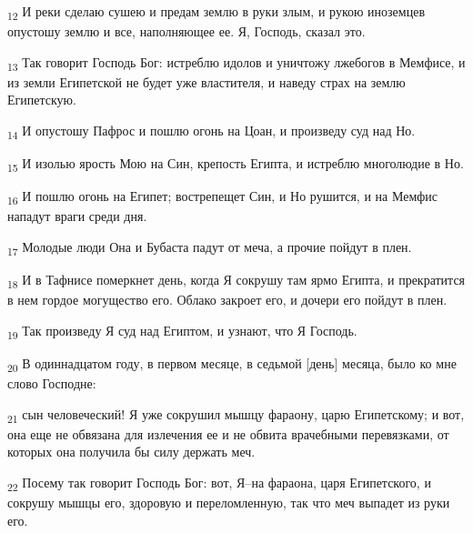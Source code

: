\begin{tcolorbox}
\textsubscript{12} И реки сделаю сушею и предам землю в руки злым, и рукою иноземцев опустошу землю и все, наполняющее ее. Я, Господь, сказал это.
\end{tcolorbox}
\begin{tcolorbox}
\textsubscript{13} Так говорит Господь Бог: истреблю идолов и уничтожу лжебогов в Мемфисе, и из земли Египетской не будет уже властителя, и наведу страх на землю Египетскую.
\end{tcolorbox}
\begin{tcolorbox}
\textsubscript{14} И опустошу Пафрос и пошлю огонь на Цоан, и произведу суд над Но.
\end{tcolorbox}
\begin{tcolorbox}
\textsubscript{15} И изолью ярость Мою на Син, крепость Египта, и истреблю многолюдие в Но.
\end{tcolorbox}
\begin{tcolorbox}
\textsubscript{16} И пошлю огонь на Египет; вострепещет Син, и Но рушится, и на Мемфис нападут враги среди дня.
\end{tcolorbox}
\begin{tcolorbox}
\textsubscript{17} Молодые люди Она и Бубаста падут от меча, а прочие пойдут в плен.
\end{tcolorbox}
\begin{tcolorbox}
\textsubscript{18} И в Тафнисе померкнет день, когда Я сокрушу там ярмо Египта, и прекратится в нем гордое могущество его. Облако закроет его, и дочери его пойдут в плен.
\end{tcolorbox}
\begin{tcolorbox}
\textsubscript{19} Так произведу Я суд над Египтом, и узнают, что Я Господь.
\end{tcolorbox}
\begin{tcolorbox}
\textsubscript{20} В одиннадцатом году, в первом месяце, в седьмой [день] месяца, было ко мне слово Господне:
\end{tcolorbox}
\begin{tcolorbox}
\textsubscript{21} сын человеческий! Я уже сокрушил мышцу фараону, царю Египетскому; и вот, она еще не обвязана для излечения ее и не обвита врачебными перевязками, от которых она получила бы силу держать меч.
\end{tcolorbox}
\begin{tcolorbox}
\textsubscript{22} Посему так говорит Господь Бог: вот, Я--на фараона, царя Египетского, и сокрушу мышцы его, здоровую и переломленную, так что меч выпадет из руки его.
\end{tcolorbox}
